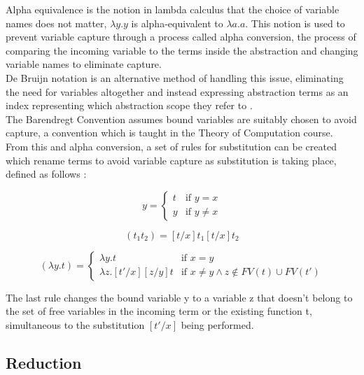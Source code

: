 \documentclass[a4paper,12pt]{report}
\begin{document}
Alpha equivalence is the notion in lambda calculus that the choice of variable names does not matter, $\lambda y.y$ is alpha-equivalent to $\lambda a.a$. This notion is used to prevent variable capture through a process called alpha conversion, the process of comparing the incoming variable to the terms inside the abstraction and changing variable names to eliminate capture.\\

De Bruijn notation is an alternative method of handling this issue, eliminating the need for variables altogether and instead expressing abstraction terms as an index representing which abstraction scope they refer to \cite{Kamareddine2000}.\\

The Barendregt Convention assumes bound variables are suitably chosen to avoid capture, a convention which is taught in the Theory of Computation course. From this and alpha conversion, a set of rules for substitution can be created which rename terms to avoid variable capture as substitution is taking place, defined as follows \cite{Acar2008}:

\begin{equation}
[t/x]y=\begin{cases}
t & \text{if $y=x$}\\
y & \text{if $y\ne x$}
\end{cases}
\end{equation}

\begin{equation}
[t/x](t_1t_2)=[t/x]t_1[t/x]t_2
\end{equation}

\begin{equation}
[t'/x](\lambda y.t)=\begin{cases}
\lambda y.t & \text{if $x=y$}\\
\lambda z.[t'/x][z/y]t & \text{if $x\ne y \land z\notin FV(t) \cup FV(t')$}
\end{cases}
\end{equation}

The last rule changes the bound variable y to a variable z that doesn’t belong to the set of free variables in the incoming term or the existing function t, simultaneous to the substitution $[t' / x]$ being performed.

\subsection{Reduction}
\end{document}
